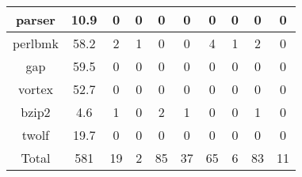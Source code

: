 \begin{table}[!h]
\begin{tabular}{|c|c|c|c|c|c|c|c|c|c|}
\hline
parser    & 10.9   & 0	 & 0	 & 0	   &0  & 0    & 0  & 0  & 0\\
\hline
perlbmk & 58.2   & 2   & 1	 & 0	   & 0  &	4   & 1  & 2  & 0\\
\hline
gap        & 59.5   &  0 & 0 & 0    & 	0  &	0   & 0   & 0	& 0\\
\hline
vortex    & 52.7    & 0	 & 0	 & 0	   & 0  &	0   & 0   & 0	& 0\\
\hline 
bzip2     & 4.6      & 1 & 0	 & 2	   & 1  &	0   & 0   & 1	& 0\\
\hline
twolf     & 19.7     & 0 & 0	 & 0	   & 0  &	0   & 0   & 0	& 0\\
\hline
Total     & 581      & 19 & 2 & 85 &	37 & 65 & 6	& 83 & 11\\
\hline
\end{tabular}
\end{table}

